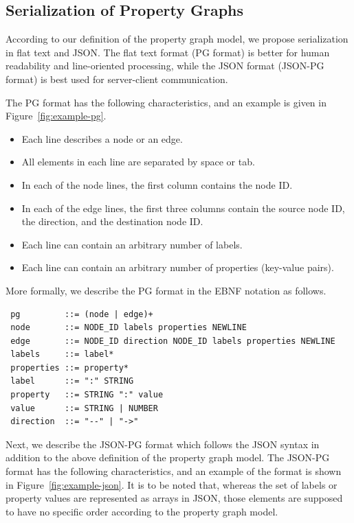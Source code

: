 \documentclass[runningheads]{llncs}
\begin{document}
\subsection{Serialization of Property Graphs}
According to our definition of the property graph model, we propose serialization in flat text and JSON. The flat text format (PG format) is better for human readability and line-oriented processing, while the JSON format (JSON-PG format) is best used for server-client communication.

The PG format has the following characteristics, and an example is given in Figure~\ref{fig:example-pg}.

\begin{itemize}
    \item Each line describes a node or an edge.
    \item All elements in each line are separated by space or tab.
    \item In each of the node lines, the first column contains the node ID.
    \item In each of the edge lines, the first three columns contain the source node ID, the direction, and the destination node ID.
    \item Each line can contain an arbitrary number of labels.
    \item Each line can contain an arbitrary number of properties (key-value pairs).
\end{itemize}

More formally, we describe the PG format in the EBNF notation as follows.

\begin{defi}
\leavevmode
\begin{verbatim}
 pg         ::= (node | edge)+
 node       ::= NODE_ID labels properties NEWLINE
 edge       ::= NODE_ID direction NODE_ID labels properties NEWLINE
 labels     ::= label*
 properties ::= property*
 label      ::= ":" STRING
 property   ::= STRING ":" value
 value      ::= STRING | NUMBER
 direction  ::= "--" | "->"
\end{verbatim}
\end{defi}

Next, we describe the JSON-PG format which follows the JSON syntax in addition to the above definition of the property graph model. The JSON-PG format has the following characteristics, and an example of the format is shown in Figure~\ref{fig:example-json}. It is to be noted that, whereas the set of labels or property values are represented as arrays in JSON, those elements are supposed to have no specific order according to the property graph model.
\end{document}

